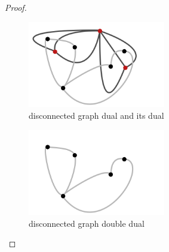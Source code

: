 \begin{proof}
\begin{enumerate}[label=(\roman*)]
            \begin{figure}[H]
                \begin{center}
                \includegraphics[width=6cm]{Test2/Problem8/TwoTrianglesDualDual.png}
                \end{center}                            
                \caption{disconnected graph dual and its dual}
                \label{t2:p8_TwoTrianglesDualDual.png}                        
            \end{figure}\pn
            
            \begin{figure}[H]
                \begin{center}
                \includegraphics[width=6cm]{Test2/Problem8/TwoTrianglesConnected.png}
                \end{center}                            
                \caption{disconnected graph double dual}
                \label{t2:p8_TwoTrianglesConnected.png}                        
            \end{figure}\pn
    \end{enumerate}
\end{proof}